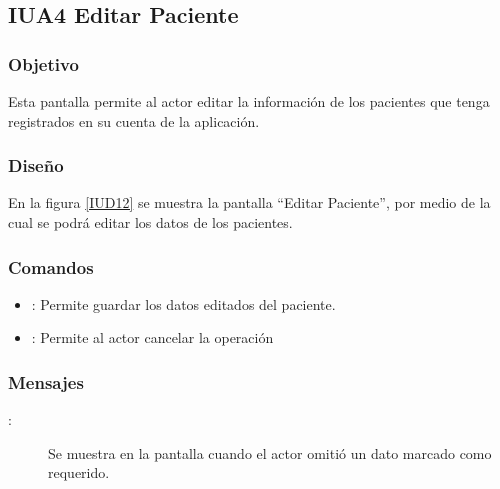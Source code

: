 \subsection{IUA4 Editar Paciente}
 
\subsubsection{Objetivo}

    Esta pantalla permite al actor editar la información de los pacientes que tenga registrados en su cuenta de la aplicación.

\subsubsection{Diseño}

    En la figura \ref{IUD12} se muestra la pantalla ``Editar Paciente'', por medio de la cual se podrá editar los datos de los pacientes. \\


\subsubsection{Comandos}
\begin{itemize}
    \item {}: Permite guardar los datos editados del paciente.
    \item {}: Permite al actor cancelar la operación
    
\end{itemize}

\subsubsection{Mensajes}

\begin{description}
    \item[:] Se muestra en la pantalla  cuando el actor omitió un dato marcado como requerido.
    
\end{description}
